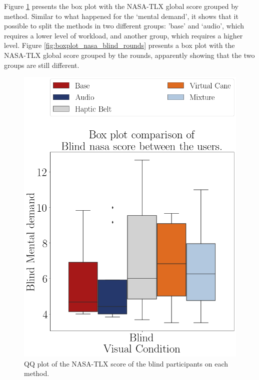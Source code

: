 Figure \ref{fig:boxplot_nasa_blind_scene} presents the box plot with the NASA-TLX global score grouped by method. Similar to what happened for the ‘mental demand’, it shows that it possible to split the methods in two different groups: ’base’ and ‘audio’, which requires a lower level of workload, and another group, which requires a higher level. Figure \ref{fig:boxplot_nasa_blind_rounds} presents a box plot with the NASA-TLX global score grouped by the rounds, apparently showing that the two groups are still different. 

\begin{figure}[!htb]
    \centering
    \begin{minipage}{0.45\textwidth}
        \centering
        \includegraphics[width = 0.8\linewidth]{Resultados/Nasa/Figuras/png/boxplot_nasa_blind_scene.png}
        \caption{QQ plot of the NASA-TLX score of the blind participants on each method.}
        \label{fig:boxplot_nasa_blind_scene}
    \end{minipage}
    \begin{minipage}{0.45\textwidth}
        \centering

\end{minipage}
\end{figure}
